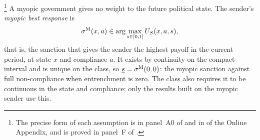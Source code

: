 \footnote{The precise form of each assumption is in panel~A0 of
 and in  of the Online
Appendix, and  is proved in panel~F of
.} A myopic government gives no weight to the future
political state. The sender's \emph{myopic best response} is
\begin{equation}
\sigma^{\mathrm{M}}(x,a)\in\arg\max_{s\in[0,1]}U_S(x,a,s),
\end{equation}
that is, the sanction that gives the sender the highest payoff in the current period, at
state $x$ and compliance $a$. It exists by continuity on the compact interval and is
unique on the class, so $\underline s=\sigma^{\mathrm{M}}(0,0)$: the myopic sanction against full
non-compliance when entrenchment is zero. The class also requires it to be continuous in the
state and compliance; only the results built on the myopic sender use this.

